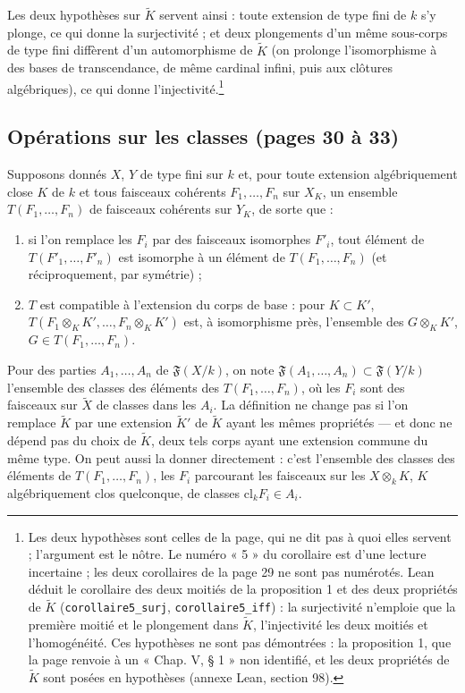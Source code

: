 \documentclass[11pt,a4paper]{article}
\begin{document}
Les deux hypothèses sur $\widetilde{K}$ servent ainsi : toute extension de
type fini de $k$ s'y plonge, ce qui donne la surjectivité ; et deux
plongements d'un même sous-corps de type fini diffèrent d'un automorphisme de
$\widetilde{K}$ (on prolonge l'isomorphisme à des bases de transcendance,
de même cardinal infini, puis aux clôtures algébriques), ce qui
donne l'injectivité.\footnote{Les deux hypothèses sont celles de la page,
qui ne dit pas à quoi elles servent ; l'argument est le nôtre. Le numéro
« 5 » du corollaire est d'une lecture incertaine ; les deux corollaires de
la page 29 ne sont pas numérotés. Lean déduit le corollaire des deux moitiés
de la proposition 1 et des deux propriétés de $\widetilde{K}$
(\texttt{corollaire5\_surj}, \texttt{corollaire5\_iff}) : la surjectivité
n'emploie que la première moitié et le plongement dans $\widetilde{K}$,
l'injectivité les deux moitiés et l'homogénéité. Ces hypothèses ne sont pas
démontrées : la proposition 1, que la page renvoie à un « Chap. V, § 1 »
non identifié, et les deux propriétés de $\widetilde{K}$ sont posées en
hypothèses (annexe Lean, section 98).}

\subsection*{Opérations sur les classes (pages 30 à 33)}

Supposons donnés $X$, $Y$ de type fini sur $k$ et, pour toute extension
algébriquement close $K$ de $k$ et tous faisceaux cohérents
$F_1, \ldots, F_n$ sur $X_K$, un ensemble $T(F_1, \ldots, F_n)$ de
faisceaux cohérents sur $Y_K$, de sorte que :
\begin{enumerate}
\item[(i)] si l'on remplace les $F_i$ par des faisceaux isomorphes $F'_i$,
tout élément de $T(F'_1, \ldots, F'_n)$ est isomorphe à un élément de
$T(F_1, \ldots, F_n)$ (et réciproquement, par symétrie) ;
\item[(ii)] $T$ est compatible à l'extension du corps de base : pour
$K \subset K'$, $T(F_1 \otimes_K K', \ldots, F_n \otimes_K K')$ est, à
isomorphisme près, l'ensemble des $G \otimes_K K'$, $G \in T(F_1, \ldots,
F_n)$.
\end{enumerate}
Pour des parties $A_1, \ldots, A_n$ de $\mathfrak{F}(X/k)$, on note
$\mathfrak{F}(A_1, \ldots, A_n) \subset \mathfrak{F}(Y/k)$ l'ensemble des
classes des éléments des $T(F_1, \ldots, F_n)$, où les $F_i$ sont des
faisceaux sur $\widetilde{X}$ de classes dans les $A_i$. La définition ne
change pas si l'on remplace $\widetilde{K}$ par une extension
$\widetilde{K}'$ de $\widetilde{K}$ ayant les mêmes propriétés --- et donc ne
dépend pas du choix de $\widetilde{K}$, deux tels corps ayant une extension
commune du même type. On peut aussi la donner directement : c'est
l'ensemble des classes des éléments de $T(F_1, \ldots, F_n)$, les $F_i$
parcourant les faisceaux sur les $X \otimes_k K$, $K$ algébriquement clos
quelconque, de classes $\mathrm{cl}_k F_i \in A_i$.
\end{document}
